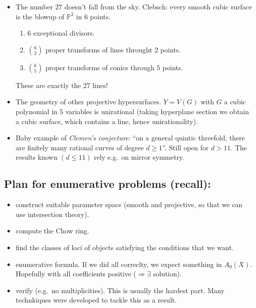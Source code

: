 \documentclass[12pt,a4paper]{amsart}
\theoremstyle{plain}
\theoremstyle{definition}
\theoremstyle{remark}
\begin{document}
\begin{itemize}
  \item The number $27$ doesn't fall from the sky.
    Clebsch: every smooth cubic surface is the blowup of $\mathbb{P}^{2}$ in $6$ points.
    \begin{enumerate}[label=-]
      \item $6$ exceptional divisors.
      \item $\binom{6}{2}$ proper transforms of lines throught $2$ points.
      \item $\binom{6}{5}$ proper transforms of conics through $5$ points.
    \end{enumerate}
    These are exactly the $27$ lines!
  \item The geometry of other projective hypersurfaces.
    $Y = V(G)$ with $G$ a cubic polynomial in $5$ variables is unirational (taking hyperplane section we obtain a cubic surface, which contains a line, hence unirationality).
  \item Baby example of \textit{Clemen's conjecture}: ``on a general quintic threefold, there are finitely many rational curves of degree $d \geq 1$''.
    Still open for $d > 11$.
    The results known $(d \leq 11)$ rely e.g.~on mirror symmetry.
\end{itemize}

\subsection{Plan for enumerative problems (recall):}

\begin{itemize}
  \item \underline{} construct suitable parameter space (smooth and projective, so that we can use intersection theory).
  \item \underline{} compute the Chow ring.
  \item \underline{} find the classes of loci of objects satisfying the conditions that we want.
  \item \underline{} enumerative formula.
    If we did all correclty, we expect something in $A_{0}(X)$.
    Hopefully with all coefficients positive ($\Rightarrow \exists$ solution).
  \item \underline{} verify (e.g.~no multiplicities).
    This is usually the hardest part.
    Many technkiques were developed to tackle this as a result.
\end{itemize}
\end{document}
